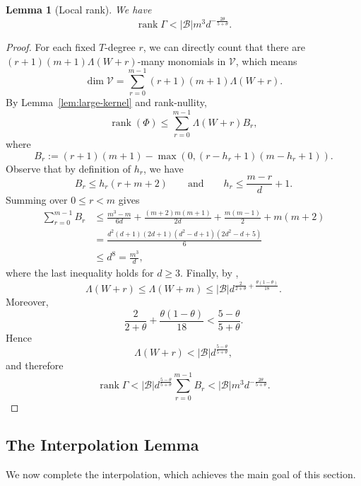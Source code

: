 \documentclass[11pt]{article}
\newtheorem{lemma}[theorem]{Lemma}
\let \cref \Cref
\begin{document}
\begin{lemma}[Local rank]\label{lem:local-rank}
We have
\begin{equation}\label{eq:local-rank}
\operatorname{rank}\Gamma
<
|\mathcal B|m^3d^{-\frac{2\theta}{5+\theta}}.
\end{equation}
\end{lemma}
\begin{proof}
For each fixed $T$-degree $r$, we can directly count that there are
$(r+1)(m+1)\Lambda(W+r)$-many
monomials in $\mathcal V$, which means
\[
\dim\mathcal V
=
\sum_{r=0}^{m-1}
(r+1)(m+1)\Lambda(W+r).
\]
By Lemma~\ref{lem:large-kernel} and rank-nullity,
\[
\operatorname{rank}(\Phi)
\le
\sum_{r=0}^{m-1}
\Lambda(W+r)B_r,
\]
where
\[
B_r
:=
(r+1)(m+1)
-
\max(0,(r-h_r+1)(m-h_r+1)).
\]
Observe that by definition of $h_r$, we have
\[
B_r\le h_r(r+m+2)
\qquad\text{and}\qquad
h_r\le \frac{m-r}{d}+1.
\]
Summing over $0\le r<m$ gives
\begin{align*}
\sum_{r=0}^{m-1}B_r
&\le
\frac{m^3-m}{6d}
+\frac{(m+2)m(m+1)}{2d}
+\frac{m(m-1)}2
+m(m+2) \\
&=
\frac{
d^2(d+1)(2d+1)(d^2-d+1)(2d^2-d+5)
}{6} \\
&\le d^8
=
\frac{m^3}{d},
\end{align*}
where the last inequality holds for $d\ge3$.
Finally, by \cref{lem:scaled-shell},
\[
\Lambda(W+r)
\le
\Lambda(W+m)
\le
|\mathcal B|
d^{\frac{2}{2+\theta}+\frac{\theta(1-\theta)}{18}}.
\]
Moreover,
\[
\frac{2}{2+\theta}
+
\frac{\theta(1-\theta)}{18}
<
\frac{5-\theta}{5+\theta}.
\]
Hence
\[
\Lambda(W+r)
<
|\mathcal B|d^{\frac{5-\theta}{5+\theta}},
\]
and therefore
\[
\operatorname{rank} \Gamma
<
|\mathcal B|d^{\frac{5-\theta}{5+\theta}}
\sum_{r=0}^{m-1}B_r
<
|\mathcal B|m^3d^{-\frac{2\theta}{5+\theta}}.
\]
\end{proof}

\subsection{The Interpolation Lemma}
We now complete the interpolation, which achieves the main goal of this section. 
\end{document}

